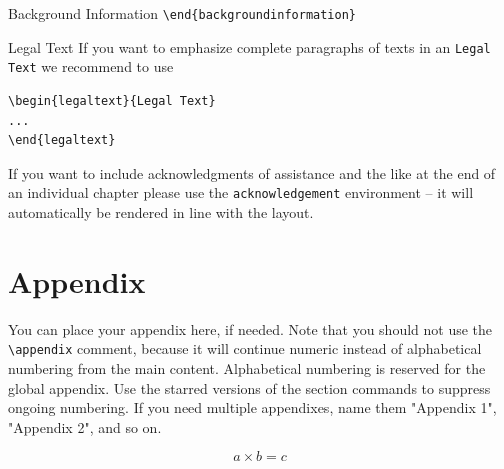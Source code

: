\begin{bibunit}
\begin{backgroundinformation}{Background Information}
\verb|\end{backgroundinformation}|
\end{backgroundinformation}
\begin{legaltext}{Legal Text}
If you want to emphasize complete paragraphs of texts in an \verb|Legal Text| we recommend to
use  \begin{verbatim}\begin{legaltext}{Legal Text}
...
\end{legaltext}\end{verbatim}
\end{legaltext}
%
\begin{acknowledgement}
If you want to include acknowledgments of assistance and the like at the end of an individual chapter please use the \verb|acknowledgement| environment -- it will automatically be rendered in line with the layout.
\end{acknowledgement}
%

\section*{Appendix}\label{01:appendix}

You can place your appendix here, if needed. Note that you should not use the \verb|\appendix| comment, because it will continue numeric instead of alphabetical numbering from the main content. Alphabetical numbering is reserved for the global appendix. Use the starred versions of the section commands to suppress ongoing numbering. If you need multiple appendixes, name them "Appendix 1", "Appendix 2", and so on.

\begin{equation}
a \times b = c
\end{equation}



\putbib[bibliography]	%

\end{bibunit}